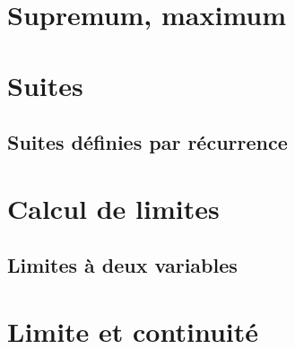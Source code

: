 
\section{Supremum, maximum}





\section{Suites}




\subsection{Suites définies par récurrence}



\section{Calcul de limites}
\label{SecCalcLimFHtQNu}


\subsection{Limites à deux variables}



					\section{Limite et continuité}

